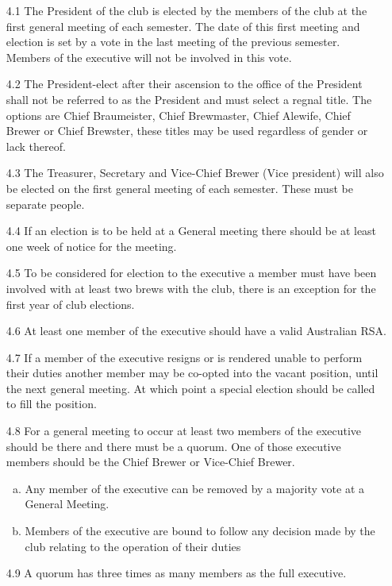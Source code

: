\documentclass{article}
\begin{document}
\begin{enumerate}
    \item[4.1] The President of the club is elected by the members of the club at the first general meeting of each semester. The date of this first meeting and election is set by a vote in the last meeting of the previous semester. Members of the executive will not be involved in this vote.
    \item[4.2] The President-elect after their ascension to the office of the President shall not be referred to as the President and must select a regnal title. The options are Chief Braumeister, Chief Brewmaster, Chief Alewife, Chief Brewer or Chief Brewster, these titles may be used regardless of gender or lack thereof.
    \item[4.3] The Treasurer, Secretary and Vice-Chief Brewer (Vice president) will also be elected on the first general meeting of each semester. These must be separate people.
    \item[4.4] If an election is to be held at a General meeting there should be at least one week of notice for the meeting.
    \item[4.5] To be considered for election to the executive a member must have been involved with at least two brews with the club, there is an exception for the first year of club elections.
    \item[4.6] At least one member of the executive should have a valid Australian RSA.
    \item[4.7] If a member of the executive resigns or is rendered unable to perform their duties another member may be co-opted into the vacant position, until the next general meeting. At which point a special election should be called to fill the position.
    \item[4.8] For a general meeting to occur at least two members of the executive should be there and there must be a quorum. One of those executive members should be the Chief Brewer or Vice-Chief Brewer.
    \begin{enumerate}[a.]
        \item Any member of the executive can be removed by a majority vote at a General Meeting.
        \item Members of the executive are bound to follow any decision made by the club relating to the operation of their duties
    \end{enumerate}
    \item[4.9] A quorum has three times as many members as the full executive.
\end{enumerate}
\end{document}
